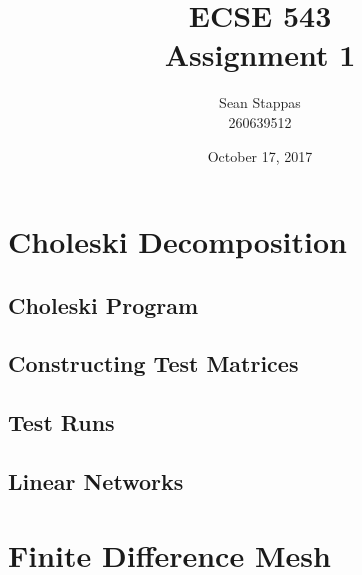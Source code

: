 \documentclass[a4paper,titlepage]{article}
\title{\textbf{ECSE 543 \\ Assignment 1}}
\author{Sean Stappas \\ 260639512}
\date{October 17, 2017}
\begin{document}
	\sloppy
	\maketitle
	\twocolumn
	
	\section{Choleski Decomposition}
	
	\subsection{Choleski Program}
	
	\subsection{Constructing Test Matrices}
	
	\subsection{Test Runs}
	
	\subsection{Linear Networks}
	
	\section{Finite Difference Mesh}
	
\end{document}

